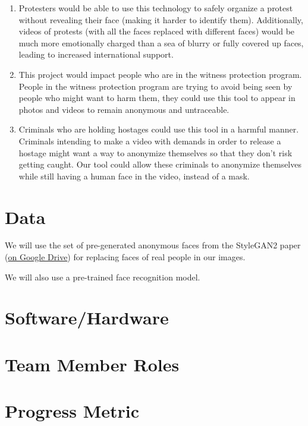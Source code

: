 \begin{enumerate}
    \item Protesters would be able to use this technology to safely organize a protest without revealing their face (making it harder to identify them). Additionally, videos of protests (with all the faces replaced with different faces) would be much more emotionally charged than a sea of blurry or fully covered up faces, leading to increased international support.


    \item This project would impact people who are in the witness protection program. People in the witness protection program are trying to avoid being seen by people who might want to harm them, they could use this tool to appear in photos and videos to remain anonymous and untraceable.


    \item Criminals who are holding hostages could use this tool in a harmful manner. Criminals intending to make a video with demands in order to release a hostage might want a way to anonymize themselves so that they don't risk getting caught. Our tool could allow these criminals to anonymize themselves while still having a human face in the video, instead of a mask.

\end{enumerate}

\section*{Data}


We will use the set of pre-generated anonymous faces from the StyleGAN2 paper (\href{https://drive.google.com/drive/folders/1-0YhtXe_oE2ei0R471X33a_NJyY5dVge}{on Google Drive}) for replacing faces of real people in our images.

We will also use a pre-trained face recognition model.


\section*{Software/Hardware}

\section*{Team Member Roles}

\section*{Progress Metric}


